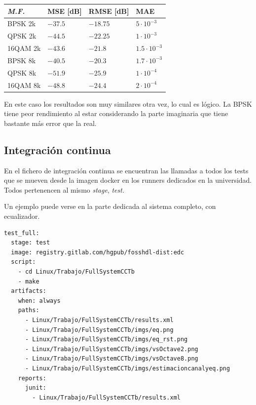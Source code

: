 \documentclass[11pt]{scrartcl} %
\begin{document}
\begin{preview}
\vspace{5mm} 
\begin{minipage}{\linewidth}
	\begin{center}
	\centering %
		\begin{tabular}{l l l l}
		\toprule
		\textit{M.F.} & \textbf{MSE [dB]} & \textbf{RMSE [dB]} & \textbf{MAE}\\
		\midrule
		BPSK 2k & $-37.5$ &  $-18.75$ & $5 \cdot 10^{-3}$ \\
		QPSK 2k & $-44.5$ &  $-22.25$ & $1 \cdot 10^{-3}$ \\
		16QAM 2k& $-43.6$ &  $-21.8$ & $1.5 \cdot 10^{-3}$ \\
		BPSK 8k & $-40.5$ &  $-20.3$ & $1.7 \cdot 10^{-3}$ \\
		QPSK 8k & $-51.9$ &  $-25.9$ & $1 \cdot 10^{-4}$ \\
		16QAM 8k& $-48.8$ &  $-24.4$ & $2 \cdot 10^{-4}$ \\
		\bottomrule
	\end{tabular}
	\end{center}
	\label{tablamatlabruido}
\end{minipage}	

En este caso los resultados son muy similares otra vez, lo cual es lógico. La BPSK tiene peor rendimiento al estar considerando la parte imaginaria que tiene bastante más error que la real.

\subsection{Integración continua}

En el fichero de integración continua se encuentran las llamadas a todos los tests que se mueven desde la imagen docker en los runners dedicados en la universidad. Todos pertenencen al mismo \emph{stage}, \emph{test.}

Un ejemplo puede verse en la parte dedicada al sistema completo, con ecualizador.

\begin{verbatim}
test_full:
  stage: test
  image: registry.gitlab.com/hgpub/fosshdl-dist:edc
  script:
    - cd Linux/Trabajo/FullSystemCCTb
    - make
  artifacts:
    when: always
    paths:
      - Linux/Trabajo/FullSystemCCTb/results.xml
      - Linux/Trabajo/FullSystemCCTb/imgs/eq.png
      - Linux/Trabajo/FullSystemCCTb/imgs/eq_rst.png
      - Linux/Trabajo/FullSystemCCTb/imgs/vsOctave2.png
      - Linux/Trabajo/FullSystemCCTb/imgs/vsOctave8.png
      - Linux/Trabajo/FullSystemCCTb/imgs/estimacioncanalyeq.png
    reports:
      junit:
        - Linux/Trabajo/FullSystemCCTb/results.xml
\end{verbatim}


\end{preview}
\end{document}
